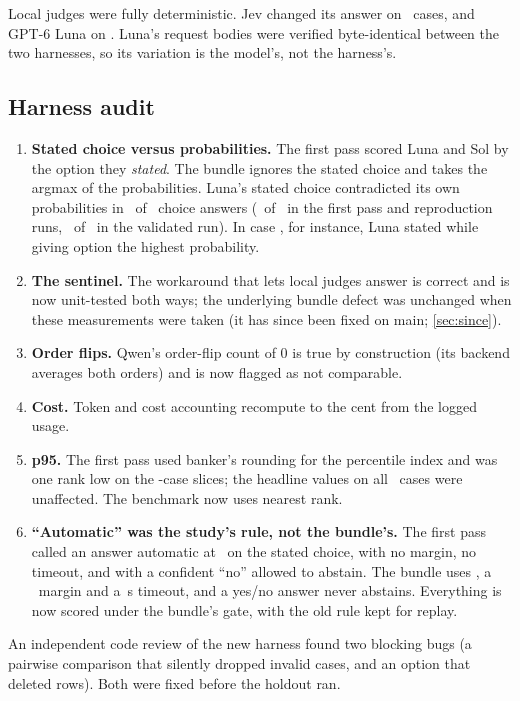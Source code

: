Local judges were fully deterministic. Jev changed its answer on \JevChangedCases\ cases, and GPT-6
Luna on \LunaChangedCases. Luna's request bodies were verified byte-identical between the two harnesses,
so its variation is the model's, not the harness's.

\subsection{Harness audit}

\begin{enumerate}
  \item \textbf{Stated choice versus probabilities.} The first pass scored Luna and Sol by the option
    they \emph{stated}. The bundle ignores the stated choice and takes the argmax of the probabilities.
    Luna's stated choice contradicted its own probabilities in \LunaMismatchK\ of \LunaMismatchN\ choice
    answers (\LunaMismatchFpK\ of \LunaMismatchFpN\ in the first pass and reproduction runs,
    \LunaMismatchDevK\ of \LunaMismatchDevN\ in the validated run). In case , for
    instance, Luna stated  while giving option  the highest probability.
  \item \textbf{The  sentinel.} The workaround that lets local judges answer 
    is correct and is now unit-tested both ways; the underlying bundle defect was unchanged when these
    measurements were taken (it has since been fixed on main; \cref{sec:since}).
  \item \textbf{Order flips.} Qwen's order-flip count of 0 is true by construction (its backend averages
    both orders) and is now flagged as not comparable.
  \item \textbf{Cost.} Token and cost accounting recompute to the cent from the logged usage.
  \item \textbf{p95.} The first pass used banker's rounding for the percentile index and was one rank
    low on the \DevNFresh-case slices; the headline values on all \DevN\ cases were unaffected. The benchmark
    now uses nearest rank.
  \item \textbf{``Automatic'' was the study's rule, not the bundle's.} The first pass called an answer
    automatic at \StudyCutoff\ on the stated choice, with no margin, no timeout, and with a confident
    ``no'' allowed to abstain. The bundle uses \MinP, a \MinMargin\ margin and a \TimeoutS\,s timeout,
    and a yes/no answer never abstains. Everything is now scored under the bundle's gate, with the old
    rule kept for replay.
\end{enumerate}
An independent code review of the new harness found two blocking bugs (a pairwise comparison that
silently dropped invalid cases, and an  option that deleted rows). Both were fixed before
the holdout ran.


